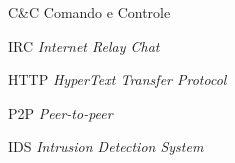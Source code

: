 \begin{siglas}
	\item[C\&C] Comando e Controle
	\item[IRC] \textit{Internet Relay Chat}
	\item[HTTP] \textit{HyperText Transfer Protocol}
	\item[P2P] \textit{Peer-to-peer}
	\item[IDS] \textit{Intrusion Detection System}
\end{siglas}
